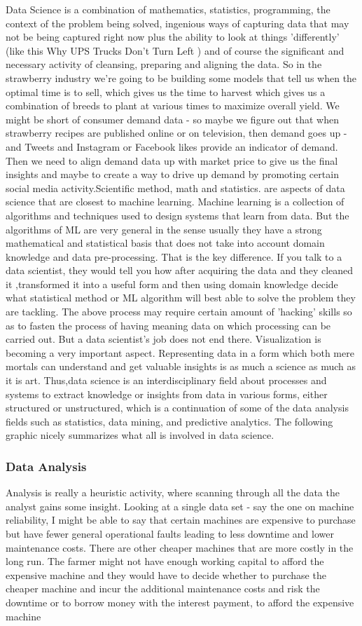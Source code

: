 \documentclass[a4paper,12pt,oneside]{report}
\begin{document}
{{Data Science is a combination of mathematics, statistics, programming, the context of the problem being solved, ingenious ways of capturing data that may not be being captured right now plus the ability to look at things 'differently'  (like this Why UPS Trucks Don't Turn Left ) and of course the significant and necessary activity of cleansing, preparing and aligning the data. So in the strawberry industry we're going to be building some models that tell us when the optimal time is to sell, which gives us the time to harvest which gives us a combination of breeds to plant at various times to maximize overall yield. We might be short of consumer demand data - so maybe we figure out that when strawberry recipes are published online or on television, then demand goes up - and Tweets and Instagram or Facebook likes provide an indicator of demand. Then we need to align demand data up with market price to give us the final insights and maybe to create a way to drive up demand by promoting certain social media activity.Scientific method, math and statistics. are aspects of data science that are closest to machine learning.  Machine learning is a collection of algorithms and techniques used to design systems that learn from data. But the algorithms of ML are very general in the sense usually they have a strong mathematical and statistical basis that does not take into account domain knowledge and data pre-processing. That is the key difference.  If you talk to a data scientist, they would tell you how after acquiring the data and they cleaned it ,transformed it into a useful form and then using domain knowledge decide what statistical method or ML algorithm will best able to solve the problem they are tackling. The  above process may require certain amount of 'hacking' skills so as to fasten the process of having meaning data on which processing can be carried out. But a data scientist's job does not end there. Visualization is becoming a very important aspect. Representing data in a form which both mere mortals can understand and get valuable insights is as much a science as much as it is art.
Thus,data science is an interdisciplinary field about processes and systems to extract knowledge or insights from data in various forms, either structured or unstructured, which is a continuation of some of the data analysis fields such as statistics, data mining, and predictive analytics. The following graphic nicely summarizes what all is involved in data science.
\subsubsection{Data Analysis }
{Analysis is really a heuristic activity, where scanning through all the data the analyst gains some insight. Looking at a single data set - say the one on machine reliability, I might be able to say that certain machines are expensive to purchase but have fewer general operational faults leading to less downtime and lower maintenance costs. There are other cheaper machines that are more costly in the long run. The farmer might not have enough working capital to afford the expensive machine and they would have to decide whether to purchase the cheaper machine and incur the additional maintenance costs and risk the downtime or to borrow money with the interest payment, to afford the expensive machine}
}}
\end{document}
